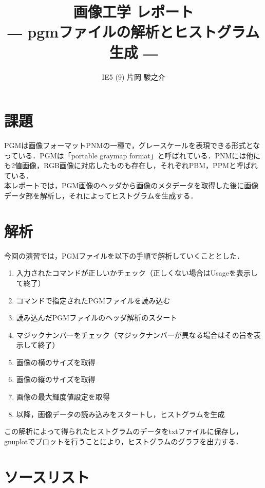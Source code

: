 \documentclass{jsarticle}
\begin{document}
\title{画像工学 レポート\\ \vspace{1cm}― pgmファイルの解析とヒストグラム生成 ―\vspace{2cm}}
\author{IE5 (9) 片岡 駿之介 \vspace{1cm}}
\maketitle

\newpage

\section{課題}

PGMは画像フォーマットPNM\cite{ref1}の一種で，グレースケールを表現できる形式となっている．PGMは「portable graymap format」と呼ばれている．PNMには他にも2値画像，RGB画像に対応したものも存在し，それぞれPBM，PPMと呼ばれている．\\
本レポートでは，PGM画像のヘッダから画像のメタデータを取得した後に画像データ部を解析し，それによってヒストグラムを生成する．

\section{解析}

今回の演習では，PGMファイルを以下の手順で解析していくこととした．
\begin{enumerate}
  \item 入力されたコマンドが正しいかチェック（正しくない場合はUsageを表示して終了）
  \item コマンドで指定されたPGMファイルを読み込む
  \item 読み込んだPGMファイルのヘッダ解析のスタート
  \item マジックナンバーをチェック（マジックナンバーが異なる場合はその旨を表示して終了）
  \item 画像の横のサイズを取得
  \item 画像の縦のサイズを取得
  \item 画像の最大輝度値設定を取得
  \item 以降，画像データの読み込みをスタートし，ヒストグラムを生成
\end{enumerate}

この解析によって得られたヒストグラムのデータをtxtファイルに保存し，gnuplotでプロットを行うことにより，ヒストグラムのグラフを出力する．
\newpage

\section{ソースリスト}
\end{document}
